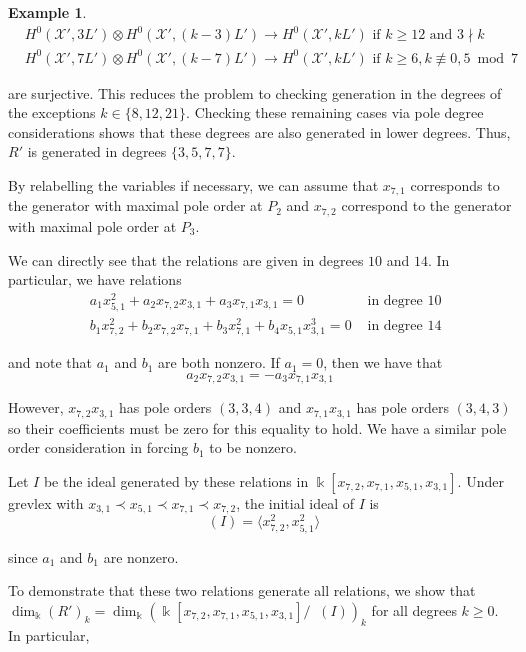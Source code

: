 \documentclass{amsart}
\theoremstyle{plain}
\theoremstyle{definition}
\newtheorem{example}[thm]{Example}
\theoremstyle{remark}
\numberwithin{equation}{section}
\newcommand\Bk{{\Bbbk}}
\newcommand\sx{\mathscr X}
\newcommand{\halfcan}{L}
\DeclareMathOperator{\initial}{in_\prec}
\begin{document}
\begin{example}
\begin{align*}
	&H^0 (\sx', 3 \halfcan') \otimes H^0 (\sx',
	(k - 3) \halfcan') \rightarrow H^0 (\sx',
	k \halfcan') \text{ if } k \geq 12 \text{ and } 3 \nmid k \\
	&H^0 (\sx', 7 \halfcan') \otimes H^0 (\sx',
	(k - 7) \halfcan') \rightarrow H^0 (\sx',
	k \halfcan') \text{ if } k \geq 6, k \not\equiv 0, 5
	\bmod 7
\end{align*}

\noindent
are surjective. This reduces the problem to checking generation
in the degrees of the exceptions $k \in \{8, 12, 21\}$.
Checking these remaining cases via pole degree considerations shows
that these degrees are also generated in lower degrees. Thus, $R'$
is generated in degrees $\{3, 5, 7, 7\}$.

By relabelling the variables if necessary, we can assume that $x_{7
, 1}$ corresponds to the generator with maximal pole order at $P_2$ 
and $x_{7, 2}$ correspond to the generator with maximal pole order 
at $P_3$.

We can directly see that the relations are given in degrees $10$
and $14$. In particular, we have relations
\begin{align*}
	&a_1 x_{5, 1}^2 + a_2 x_{7, 2} x_{3, 1} + a_3 x_{7, 1} x_{3, 1} = 
	0 &\text{ in degree $10$} \\
	&b_1 x_{7, 2}^2 + b_2 x_{7, 2} x_{7, 1} + b_3 x_{7, 1}^2
	+ b_4 x_{5, 1} x_{3, 1}^3 = 0  &\text{ in degree $14$}
\end{align*}

\noindent
and note that $a_1$ and $b_1$ are both nonzero. If $a_1 = 0$, then we
have that
\[
	a_2 x_{7, 2} x_{3, 1} = -a_3 x_{7, 1} x_{3, 1}
\]

\noindent
However, $x_{7, 2} x_{3, 1}$ has pole orders $(3, 3, 4)$ and
$x_{7, 1} x_{3, 1}$ has pole orders $(3, 4, 3)$ so their
coefficients must be zero for this equality to hold. We have a
similar pole order consideration in forcing $b_1$ to be nonzero.

Let $I$ be the ideal generated by these relations in
$\Bk[x_{7, 2}, x_{7, 1}, x_{5, 1}, x_{3, 1}]$. Under grevlex with
$x_{3,1} \prec x_{5,1} \prec x_{7,1} \prec x_{7,2}$, the initial
ideal of $I$ is
\[
	\initial(I) = \langle x_{7, 2}^2, x_{5, 1}^2 \rangle
\]

\noindent
since $a_1$ and $b_1$ are nonzero.

To demonstrate that these two relations generate all 
relations, we show that $\dim_\Bk (R')_k = \dim_\Bk
(\Bk[x_{7, 2}, x_{7, 1}, x_{5, 1}, x_{3, 1}] / \initial(I))_k$ for 
all degrees $k \geq 0$. In particular, 


\end{example}
\end{document}
